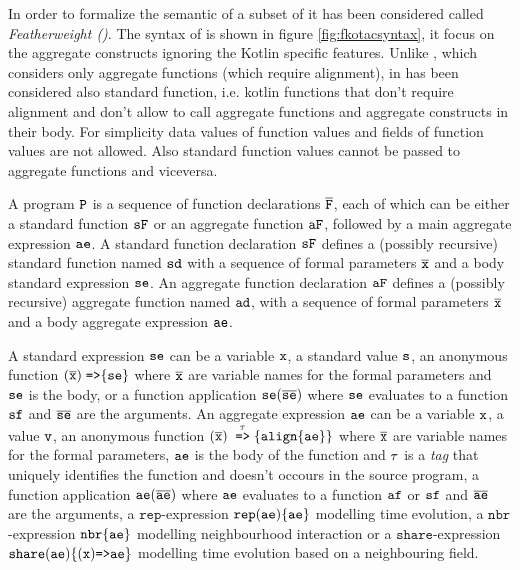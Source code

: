 In order to formalize the semantic of \Kotac{} a subset of it has been considered called \textit{Featherweight \Kotac{} (\FKotac{})}. The syntax of \FKotac is shown in figure \ref{fig:fkotacsyntax}, it focus on the aggregate constructs ignoring the Kotlin specific features. Unlike \FSCAFI, which considers only aggregate functions (which require alignment), in \FKotac has been considered also standard function, i.e. kotlin functions that don't require alignment and don't allow to call aggregate functions and aggregate constructs in their body. For simplicity data values of function values and fields of function values are not allowed. Also standard function values cannot be passed to aggregate functions and viceversa.

A program $\mathtt{P}$ is a sequence of function declarations $\overline{\mathtt{F}}$, each of which can be either a standard function $\mathtt{sF}$ or an aggregate function $\mathtt{aF}$, followed by a main aggregate expression $\mathtt{ae}$. A standard function declaration $\mathtt{sF}$ defines a (possibly recursive) standard function named $\mathtt{sd}$ with a sequence of formal parameters $\overline{\mathtt{x}}$ and a body standard expression $\mathtt{se}$. An aggregate function declaration $\mathtt{aF}$ defines a (possibly recursive) aggregate function named $\mathtt{ad}$, with a sequence of formal parameters $\overline{\mathtt{x}}$ and a body aggregate expression $\mathtt{ae}$. 

A standard expression $\mathtt{se}$ can be a variable $\mathtt{x}$, a standard value $\mathtt{s}$, an anonymous function $(\overline{\mathtt{x}}) \; \mathrm{ \texttt{=>}\{ } \mathtt{se} \}$  where $\overline{\mathtt{x}}$ are variable names for the formal parameters and $\mathtt{se}$ is the body, or a function application $\mathtt{se}(\overline{\mathtt{se}})$ where $\mathtt{se}$ evaluates to a function $\mathtt{sf}$ and $\overline{\mathtt{se}}$ are the arguments. An aggregate expression $\mathtt{ae}$ can be a variable $\mathtt{x}$, a value $\mathtt{v}$, an anonymous function $(\overline{\mathtt{x}}) \; \stackrel{\tau}{\mathrm{\texttt{=>}}}{\{\mathtt{align}\{\mathtt{ae}\}\}}$ where $\overline{\mathtt{x}}$ are variable names for the formal parameters, $\mathtt{ae}$ is the body of the function and $\tau$ is a \textit{tag} that uniquely identifies the function and doesn't occours in the source program, a function application $\mathtt{ae}(\overline{\mathtt{ae}})$ where $\mathtt{ae}$ evaluates to a function $\mathtt{af}$ or $\mathtt{sf}$ and $\overline{\mathtt{ae}}$ are the arguments, a $\mathtt{rep}$-expression $\mathtt{rep}(\mathtt{ae})\{ \mathtt{ae} \}$ modelling time evolution, a $\mathtt{nbr}$-expression $\mathtt{nbr}\{\mathtt{ae}\}$ modelling neighbourhood interaction or a $\mathtt{share}$-expression $\mathtt{share}(\mathtt{ae})\{(\mathtt{x}) \mathrm{ \texttt{=>}\mathtt{ae} } \}$ modelling time evolution based on a neighbouring field.

